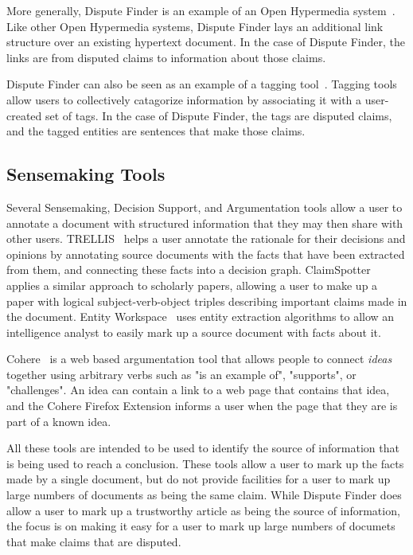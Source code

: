 \documentclass{www2010-submission}
\begin{document}
More generally, Dispute Finder is an example of an Open Hypermedia system~\cite{Bouvin2000,Wiil1996}. Like other Open Hypermedia systems, Dispute Finder lays an additional link structure over an existing hypertext document. In the case of Dispute Finder, the links are from disputed claims to information about those claims.

Dispute Finder can also be seen as an example of a tagging tool~\cite{Marlow2006,Golder2006}. Tagging tools allow users to collectively catagorize information by associating it with a user-created set of tags. In the case of Dispute Finder, the tags are disputed claims, and the tagged entities are sentences that make those claims.


\subsection{Sensemaking Tools}

Several Sensemaking, Decision Support, and Argumentation tools allow a user to annotate a document with structured information that they may then share with other users. TRELLIS~\cite{Gil2002} helps a user annotate the rationale for their decisions and opinions by annotating source documents with the facts that have been extracted from them, and connecting these facts into a decision graph. ClaimSpotter~\cite{Sereno2005,Serono2004} applies a similar approach to scholarly papers, allowing a user to make up a paper with logical subject-verb-object triples describing important claims made in the document. Entity Workspace~\cite{Bier2006} uses entity extraction algorithms to allow an intelligence analyst to easily mark up a source document with facts about it.

Cohere~\cite{Shum2008} is a web based argumentation tool that allows people to connect {\it ideas} together using arbitrary verbs such as "is an example of", "supports", or "challenges". An idea can contain a link to a web page that contains that idea, and the Cohere Firefox Extension informs a user when the page that they are is part of a known idea.

All these tools are intended to be used to identify the source of information that is being used to reach a conclusion. These tools allow a user to mark up the facts made by a single document, but do not provide facilities for a user to mark up large numbers of documents as being the same claim. While Dispute Finder does allow a user to mark up a trustworthy article as being the source of information, the focus is on making it easy for a user to mark up large numbers of documets that make claims that are disputed.
\end{document}
